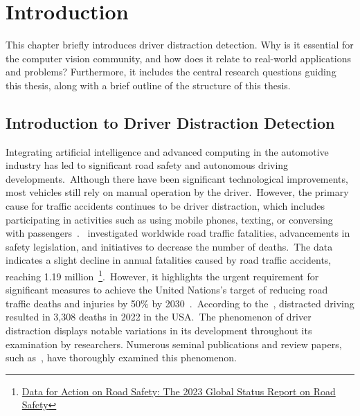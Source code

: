 \chapter{Introduction}
\label{chapter:introduction}
This chapter briefly introduces driver distraction detection. Why is it essential for the computer vision community, and how does it relate to real-world applications and problems? Furthermore, it includes the
central research questions guiding this thesis, along with a brief outline of the structure of this thesis.

\section{Introduction to Driver Distraction Detection}
Integrating artificial intelligence and advanced computing in the automotive industry has led to significant road safety and autonomous driving developments.~Although there have been significant technological improvements, most vehicles still rely on manual operation by the driver.~However, the primary cause for traffic accidents continues to be driver distraction, which includes participating in activities such as using mobile phones, texting, or conversing with passengers~\citep{bing_li_2022new, in_vehicle_cameras_9618784}.~\citet{WHO2023} investigated worldwide road traffic fatalities, advancements in safety legislation, and initiatives to decrease the number of deaths.~The data indicates a slight decline in annual fatalities caused by road traffic accidents, reaching 1.19 million~\footnote{\href{https://www.wbgalumni.org/event/data-for-action-on-road-safety-the-2023-global-status-report-on-road-safety/}{Data for Action on Road Safety: The 2023 Global Status Report on Road Safety}}.~However, it highlights the urgent requirement for significant measures to achieve the United Nations's target of reducing road traffic deaths and injuries by 50\% by 2030~\citep{WHO2023, Tanzania_Walugembe2020-ri}.~According to the~\citet{NHTSA2023}, distracted driving resulted in 3,308 deaths in 2022 in the USA.~The phenomenon of driver distraction displays notable variations in its development throughout its examination by researchers. Numerous seminal publications and review papers, such as~\citep{M1_regan2011driver, M2_young2007driver, in_vehicle_cameras_9618784, moslemi2021computer}, have thoroughly examined this phenomenon. 

